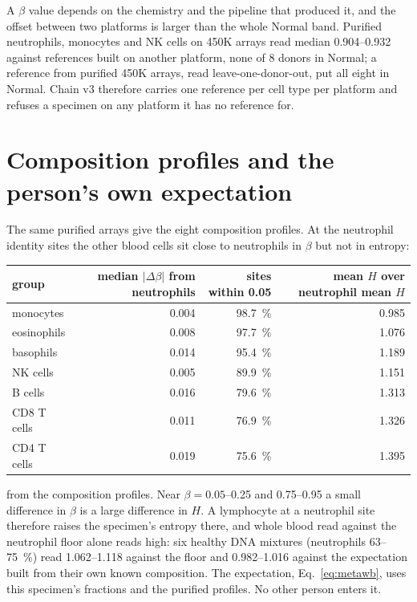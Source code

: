 A $\beta$ value depends on the chemistry and the pipeline that produced it, and the offset between two platforms is larger than the whole Normal band.
Purified neutrophils, monocytes and NK cells on 450K arrays read median 0.904--0.932 against references built on another platform, none of 8 donors in Normal; a reference from
purified 450K arrays, read leave-one-donor-out, put all eight in Normal. \measured{} Chain v3
therefore carries one reference per cell type per platform and refuses a specimen on any platform it has no reference for.

\section{Composition profiles and the person's own expectation}

The same purified arrays give the eight composition profiles. At the neutrophil identity sites the other blood cells sit close to neutrophils in
$\beta$ but not in entropy:
\begin{center}\small
\begin{tabular}{@{}lrrr@{}}\toprule
group & median $|\Delta\beta|$ from neutrophils & sites within 0.05 & mean $H$ over neutrophil mean $H$ \\\midrule
monocytes & 0.004 & 98.7~\% & 0.985 \\
eosinophils & 0.008 & 97.7~\% & 1.076 \\
basophils & 0.014 & 95.4~\% & 1.189 \\
NK cells & 0.005 & 89.9~\% & 1.151 \\
B cells & 0.016 & 79.6~\% & 1.313 \\
CD8 T cells & 0.011 & 76.9~\% & 1.326 \\
CD4 T cells & 0.019 & 75.6~\% & 1.395 \\\bottomrule
\end{tabular}
\end{center}
\calc{} from the composition profiles. Near $\beta=0.05$--0.25 and 0.75--0.95 a small difference in $\beta$ is a large
difference in $H$. A lymphocyte at a neutrophil site therefore raises the specimen's entropy there, and whole blood read against the neutrophil floor alone
reads high: six healthy DNA mixtures (neutrophils 63--75~\%) read 1.062--1.118 against the floor and 0.982--1.016 against the expectation built from their own
known composition. \measured{} The expectation, Eq.~\eqref{eq:metawb}, uses this specimen's fractions and the purified
profiles. No other person enters it.

